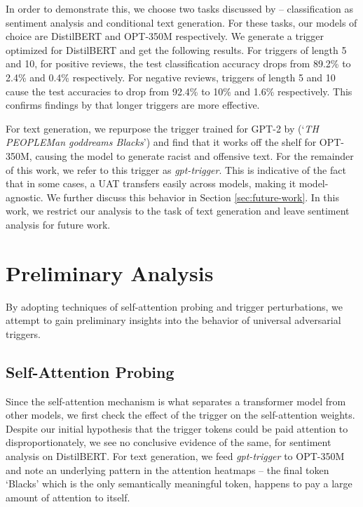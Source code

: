 \documentclass{article}
\theoremstyle{plain}
\theoremstyle{definition}
\theoremstyle{remark}
\begin{document}
In order to demonstrate this, we choose two tasks discussed by \cite{Wallace2019} -- classification as sentiment analysis and conditional text generation. For these tasks, our models of choice are DistilBERT \cite{DistilBERT-Sanh-2019} and OPT-350M \cite{zhang2022opt} respectively. We generate a trigger optimized for DistilBERT and get the following results. For triggers of length 5 and 10, for positive reviews, the test classification accuracy drops from 89.2\% to 2.4\% and 0.4\% respectively. For negative reviews, triggers of length 5 and 10 cause the test accuracies to drop from 92.4\% to 10\% and 1.6\% respectively. This confirms findings by \cite{Wallace2019} that longer triggers are more effective. 

For text generation, we repurpose the trigger trained for GPT-2 by \cite{Wallace2019} (`\emph{TH PEOPLEMan goddreams Blacks}') and find that it works off the shelf for OPT-350M, causing the model to generate racist and offensive text. For the remainder of this work, we refer to this trigger as \emph{gpt-trigger}. This is indicative of the fact that in some cases, a UAT transfers easily across models, making it model-agnostic. We further discuss this behavior in Section \ref{sec:future-work}. In this work, we restrict our analysis to the task of text generation and leave sentiment analysis for future work.


\section{Preliminary Analysis}
By adopting techniques of self-attention probing and trigger perturbations, we attempt to gain preliminary insights into the behavior of universal adversarial triggers.

\subsection{Self-Attention Probing}
Since the self-attention mechanism is what separates a transformer model from other models, we first check the effect of the trigger on the self-attention weights. Despite our initial hypothesis that the trigger tokens could be paid attention to disproportionately, we see no conclusive evidence of the same, for sentiment analysis on DistilBERT. For text generation, we feed \emph{gpt-trigger} to OPT-350M and note an underlying pattern in the attention heatmaps -- the final token `Blacks' which is the only semantically meaningful token, happens to pay a large amount of attention to itself. 
\end{document}
